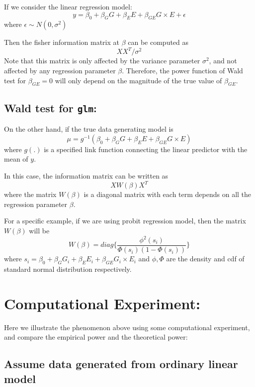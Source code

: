 \documentclass[
]{article}
\begin{document}
If we consider the linear regression model:
\[y = \beta_0 + \beta_GG +\beta_EE+\beta_{GE}G\times E+\epsilon\] where
\(\epsilon \sim N(0,\sigma^2)\)

Then the fisher information matrix at \(\beta\) can be computed as
\[XX^T/\sigma^2\] Note that this matrix is only affected by the variance
parameter \(\sigma^2\), and not affected by any regression parameter
\(\beta\). Therefore, the power function of Wald test for
\(\beta_{GE}=0\) will only depend on the magnitude of the true value of
\(\beta_{GE}\).

\hypertarget{wald-test-for-glm}{%
\subsection{\texorpdfstring{Wald test for
\texttt{glm}:}{Wald test for glm:}}\label{wald-test-for-glm}}

On the other hand, if the true data generating model is
\[\mu = g^{-1}(\beta_0 + \beta_GG +\beta_EE+\beta_{GE}G\times E)\] where
\(g(.)\) is a specified link function connecting the linear predictor
with the mean of \(y\).

In this case, the information matrix can be written as \[XW(\beta)X^T\]
where the matrix \(W(\beta)\) is a diagonal matrix with each term
depends on all the regression parameter \(\beta\).

For a specific example, if we are using probit regression model, then
the matrix \(W(\beta)\) will be
\[W(\beta) = diag\bigg\{\frac{\phi^2(s_i)}{\Phi(s_i)(1-\Phi(s_i))}\bigg\}\]
where \(s_i = \beta_0 + \beta_GG_i +\beta_EE_i+\beta_{GE}G_i\times E_i\)
and \(\phi,\Phi\) are the density and cdf of standard normal
distribution respectively.

\clearpage

\hypertarget{computational-experiment}{%
\section{Computational Experiment:}\label{computational-experiment}}

Here we illustrate the phenomenon above using some computational
experiment, and compare the empirical power and the theoretical power:

\hypertarget{assume-data-generated-from-ordinary-linear-model}{%
\subsection{Assume data generated from ordinary linear
model}\label{assume-data-generated-from-ordinary-linear-model}}
\end{document}
